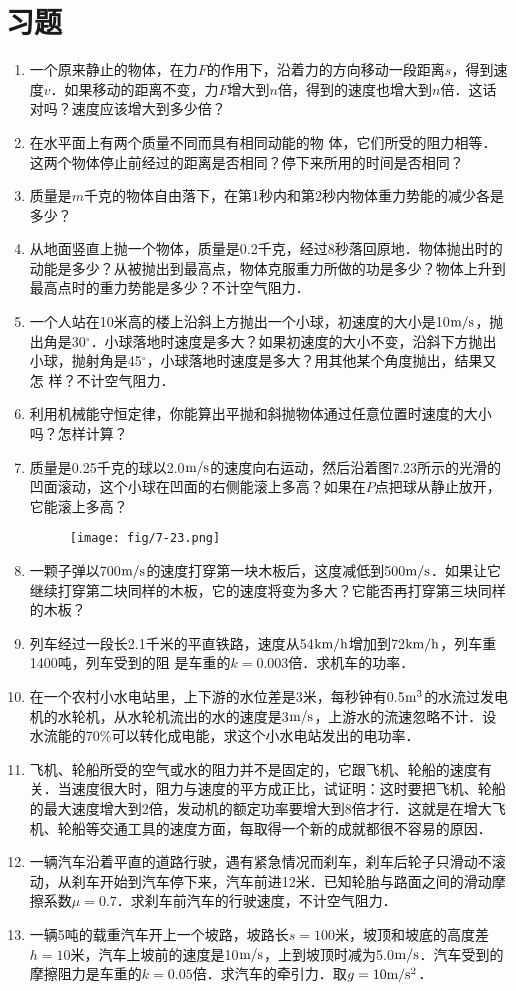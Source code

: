 \section*{习题}
\begin{enumerate}
    \item 一个原来静止的物体，在力$F$的作用下，沿着力的方向移动一段距离$s$，得到速度$v$．如果移动的距离不变，力$F$增大到$n$倍，得到的速度也增大到$n$倍．这话对吗？速度应该增大到多少倍？
    \item 在水平面上有两个质量不同而具有相同动能的物
体，它们所受的阻力相等．这两个物体停止前经过的距离是否相同？停下来所用的时间是否相同？
\item 质量是$m$千克的物体自由落下，在第1秒内和第2秒内物体重力势能的减少各是多少？
\item 从地面竖直上抛一个物体，质量是0.2千克，经过8秒落回原地．物体抛出时的动能是多少？从被抛出到最高点，物体克服重力所做的功是多少？物体上升到最高点时的重力势能是多少？不计空气阻力．
\item 一个人站在10米高的楼上沿斜上方抛出一个小球，初速度的大小是10$\text{m}/\text{s}$，抛出角是30$^\circ$．小球落地时速度是多大？如果初速度的大小不变，沿斜下方抛出小球，抛射角是45$^\circ$，小球落地时速度是多大？用其他某个角度抛出，结果又怎
样？不计空气阻力．
\item 利用机械能守恒定律，你能算出平抛和斜抛物体通过任意位置时速度的大小吗？怎样计算？
\item 质量是0.25千克的球以2.0$\text{m}/\text{s}$的速度向右运动，然后沿着图7.23所示的光滑的凹面滚动，这个小球在凹面的右侧能滚上多高？如果在$P$点把球从静止放开，它能滚上多高？
\begin{figure}[htp]\centering
\texttt{[image: fig/7-23.png]}
\caption{}
\end{figure}

\item  一颗子弹以700$\text{m}/\text{s}$的速度打穿第一块木板后，这度减低到500$\text{m}/\text{s}$．如果让它继续打穿第二块同样的木板，它的速度将变为多大？它能否再打穿第三块同样的木板？
\item  列车经过一段长2.1千米的平直铁路，速度从54$\text{km}/\text{h}$增加到72$\text{km}/\text{h}$，列车重1400吨，列车受到的阻
是车重的$k=0.003$倍．求机车的功率．
\item  在一个农村小水电站里，上下游的水位差是3米，每秒钟有0.5${\rm m^3}$的水流过发电机的水轮机，从水轮机流出的水的速度是3$\text{m}/\text{s}$，上游水的流速忽略不计．设水流能的70\%可以转化成电能，求这个小水电站发出的电功率．
\item  飞机、轮船所受的空气或水的阻力并不是固定的，它跟飞机、轮船的速度有关．当速度很大时，阻力与速度的平方成正比，试证明：这时要把飞机、轮船的最大速度增大到2倍，发动机的额定功率要增大到8倍才行．这就是在增大飞机、轮船等交通工具的速度方面，每取得一个新的成就都很不容易的原因．
\item 一辆汽车沿着平直的道路行驶，遇有紧急情况而刹车，刹车后轮子只滑动不滚动，从刹车开始到汽车停下来，汽车前进12米．已知轮胎与路面之间的滑动摩擦系数$\mu=0.7$．求刹车前汽车的行驶速度，不计空气阻力．
\item 一辆5吨的载重汽车开上一个坡路，坡路长$s=100$米，坡顶和坡底的高度差$h=10$米，汽车上坡前的速度是10$\text{m}/\text{s}$，上到坡顶时减为5.0$\text{m}/\text{s}$．汽车受到的摩擦阻力是车重的$k=0.05$倍．求汽车的牵引力．取$g=10\text{m}/\text{s}^2$．
 

\end{enumerate}
